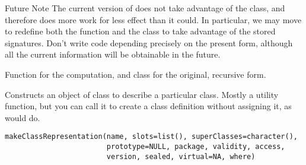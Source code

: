 %
\begin{Section}{Future Note}
The current version of  does not take advantage of
the  class, and therefore does more work for less
effect than it could.  In particular, we may move to redefine both the
function and the class to take advantage of the stored signatures.
Don't write code depending precisely on the present form, although all
the current information will be obtainable in the future.
\end{Section}
%
\begin{SeeAlso}\relax
 Function  for the computation,
and class  for the original, recursive
form.
\end{SeeAlso}
%
\begin{Description}\relax
Constructs an object of class 
to describe a particular class.  Mostly a utility function, but you can
call it to create a class definition without assigning it, as
 would do.
\end{Description}
%
\begin{Usage}
\begin{verbatim}
makeClassRepresentation(name, slots=list(), superClasses=character(),
                        prototype=NULL, package, validity, access,
                        version, sealed, virtual=NA, where)
\end{verbatim}
\end{Usage}
%
